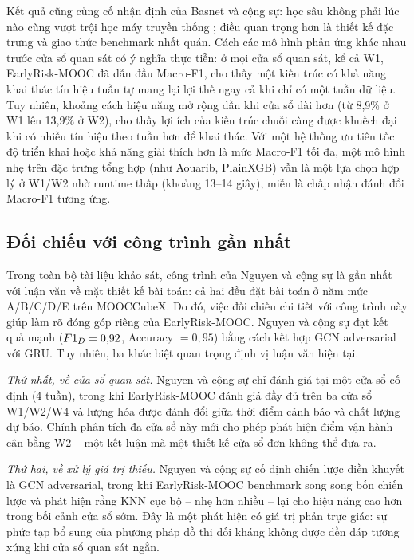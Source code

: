 Kết quả cũng củng cố nhận định của Basnet và cộng sự: học sâu không phải lúc nào cũng vượt trội học máy truyền thống \cite{Basnet2022}; điều quan trọng hơn là thiết kế đặc trưng và giao thức benchmark nhất quán. Cách các mô hình phản ứng khác nhau trước cửa sổ quan sát có ý nghĩa thực tiễn: ở mọi cửa sổ quan sát, kể cả W1, EarlyRisk-MOOC đã dẫn đầu Macro-F1, cho thấy một kiến trúc có khả năng khai thác tín hiệu tuần tự mang lại lợi thế ngay cả khi chỉ có một tuần dữ liệu. Tuy nhiên, khoảng cách hiệu năng mở rộng dần khi cửa sổ dài hơn (từ 8,9\% ở W1 lên 13,9\% ở W2), cho thấy lợi ích của kiến trúc chuỗi càng được khuếch đại khi có nhiều tín hiệu theo tuần hơn để khai thác. Với một hệ thống ưu tiên tốc độ triển khai hoặc khả năng giải thích hơn là mức Macro-F1 tối đa, một mô hình nhẹ trên đặc trưng tổng hợp (như Aouarib, PlainXGB) vẫn là một lựa chọn hợp lý ở W1/W2 nhờ runtime thấp (khoảng 13--14 giây), miễn là chấp nhận đánh đổi Macro-F1 tương ứng.

\subsection{Đối chiếu với công trình gần nhất}

Trong toàn bộ tài liệu khảo sát, công trình của Nguyen và cộng sự \cite{Nguyen2025} là gần nhất với luận văn về mặt thiết kế bài toán: cả hai đều đặt bài toán ở năm mức A/B/C/D/E trên MOOCCubeX. Do đó, việc đối chiếu chi tiết với công trình này giúp làm rõ đóng góp riêng của EarlyRisk-MOOC. Nguyen và cộng sự đạt kết quả mạnh ($F1_{D} = 0{,}92$, Accuracy $= 0{,}95$) bằng cách kết hợp GCN adversarial với GRU. Tuy nhiên, ba khác biệt quan trọng định vị luận văn hiện tại.

\textit{Thứ nhất, về cửa sổ quan sát.} Nguyen và cộng sự chỉ đánh giá tại một cửa sổ cố định (4 tuần), trong khi EarlyRisk-MOOC đánh giá đầy đủ trên ba cửa sổ W1/W2/W4 và lượng hóa được đánh đổi giữa thời điểm cảnh báo và chất lượng dự báo. Chính phân tích đa cửa sổ này mới cho phép phát hiện điểm vận hành cân bằng W2 -- một kết luận mà một thiết kế cửa sổ đơn không thể đưa ra.

\textit{Thứ hai, về xử lý giá trị thiếu.} Nguyen và cộng sự cố định chiến lược điền khuyết là GCN adversarial, trong khi EarlyRisk-MOOC benchmark song song bốn chiến lược và phát hiện rằng KNN cục bộ -- nhẹ hơn nhiều -- lại cho hiệu năng cao hơn trong bối cảnh cửa sổ sớm. Đây là một phát hiện có giá trị phản trực giác: sự phức tạp bổ sung của phương pháp đồ thị đối kháng không được đền đáp tương xứng khi cửa sổ quan sát ngắn.

